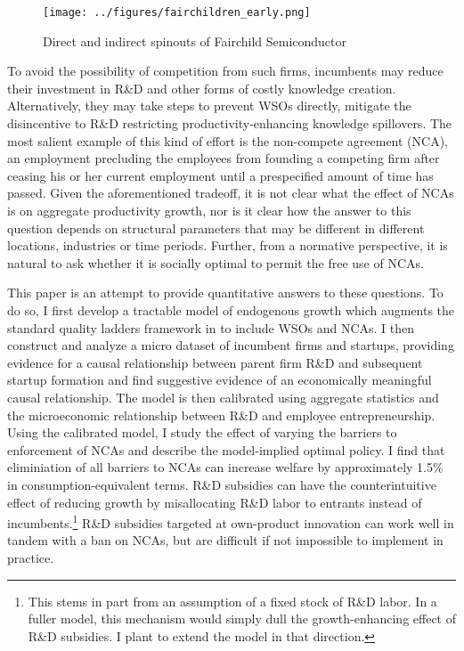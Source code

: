 \documentclass[11pt,english]{article}
\theoremstyle{remark}
\begin{document}
\begin{figure}	
	\center
	\texttt{[image: ../figures/fairchildren\_early.png]}
	\caption{Direct and indirect spinouts of Fairchild Semiconductor}
	\label{fairchild_spinouts}
\end{figure}


To avoid the possibility of competition from such firms, incumbents may reduce their investment in R\&D and other forms of costly knowledge creation. Alternatively, they may take steps to prevent WSOs directly, mitigate the disincentive to R\&D restricting productivity-enhancing knowledge spillovers. The most salient example of this kind of effort is the non-compete agreement (NCA), an employment precluding the employees from founding a competing firm after ceasing his or her current employment until a prespecified amount of time has passed. Given the aforementioned tradeoff, it is not clear what the effect of NCAs is on aggregate productivity growth, nor is it clear how the answer to this question depends on structural parameters that may be different in different locations, industries or time periods. Further, from a normative perspective, it is natural to ask whether it is socially optimal to permit the free use of NCAs.

This paper is an attempt to provide quantitative answers to these questions. To do so, I first develop a tractable model of endogenous growth which augments the standard quality ladders framework in \cite{acemoglu_introduction_2009} to include WSOs and NCAs. I then construct and analyze a micro dataset of incumbent firms and startups, providing evidence for a causal relationship between parent firm R\&D and subsequent startup formation and find suggestive evidence of an economically meaningful causal relationship. The model is then calibrated using aggregate statistics and the microeconomic relationship between R\&D and employee entrepreneurship. Using the calibrated model, I study the effect of varying the barriers to enforcement of NCAs and describe the model-implied optimal policy. I find that eliminiation of all barriers to NCAs can increase welfare by approximately 1.5\% in consumption-equivalent terms. R\&D subsidies can have the counterintuitive effect of reducing growth by misallocating R\&D labor to entrants instead of incumbents.\footnote{This stems in part from an assumption of a fixed stock of R\&D labor. In a fuller model, this mechanism would simply dull the growth-enhancing effect of R\&D subsidies. I plant to extend the model in that direction.} R\&D subsidies targeted at own-product innovation can work well in tandem with a ban on NCAs, but are difficult if not impossible to implement in practice.
\end{document}

